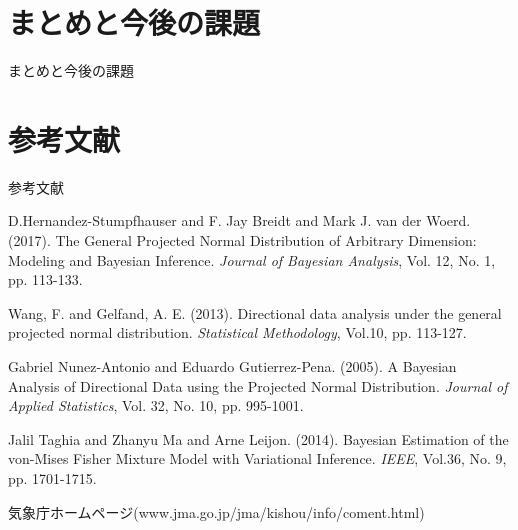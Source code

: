 \documentclass[dvipdfmx]{beamer}
\begin{document}
\section{まとめと今後の課題}
\begin{frame}{まとめと今後の課題}

\end{frame}

\section{参考文献}
\begin{frame}[allowframebreaks]{参考文献}

{\scriptsize
\begin{thebibliography}{99}
\beamertemplatetextbibitems %

D.Hernandez-Stumpfhauser and F. Jay Breidt and Mark J. van der Woerd. (2017). The General Projected Normal Distribution of Arbitrary Dimension: Modeling and Bayesian Inference. {\it Journal of Bayesian Analysis}, Vol. 12, No. 1, pp. 113-133.

Wang, F. and Gelfand, A. E. (2013). Directional data analysis under the general
projected normal distribution. {\it Statistical Methodology}, Vol.10, pp. 113-127.

Gabriel Nunez-Antonio and Eduardo Gutierrez-Pena. (2005). A Bayesian Analysis of Directional Data using the Projected Normal Distribution. {\it Journal of Applied Statistics}, Vol. 32, No. 10, pp. 995-1001.

Jalil Taghia and Zhanyu Ma and Arne Leijon. (2014). Bayesian Estimation of the von-Mises Fisher Mixture Model with Variational Inference. {\it IEEE}, Vol.36, No. 9, pp. 1701-1715.

気象庁ホームページ(www.jma.go.jp/jma/kishou/info/coment.html) 

\end{thebibliography}
}

\end{frame}
\end{document}
